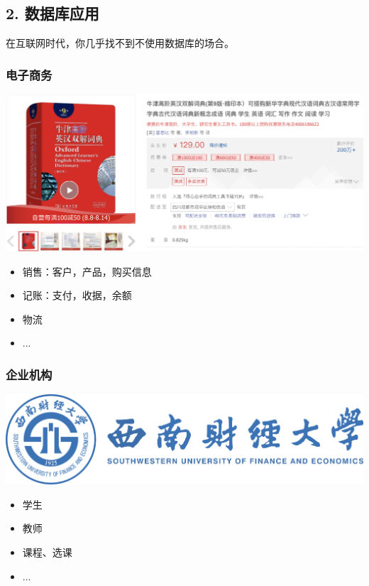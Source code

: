 \documentclass[aspectratio=169, 14pt]{beamer}
\begin{document}
\begin{frame}
\section{\textcolor{darkmidnightblue}{2. 数据库应用}}
    
在互联网时代，你几乎找不到不使用数据库的场合。
\end{frame}

\begin{frame}
    \frametitle{电子商务}
    \begin{center}
        \includegraphics[width=.55\paperwidth]{image/dict}
    \end{center}

    \begin{itemize}
        \item 销售：客户，产品，购买信息
        \item 记账：支付，收据，余额
        \item 物流
        \item ...
    \end{itemize}
\end{frame}

\begin{frame}
    \frametitle{企业机构}
    
    \includegraphics[width=.55\paperwidth]{image/swufe}
    \begin{itemize}
        \item 学生
        \item 教师
        \item 课程、选课
        \item ...
    \end{itemize}


\end{frame}
\end{document}

